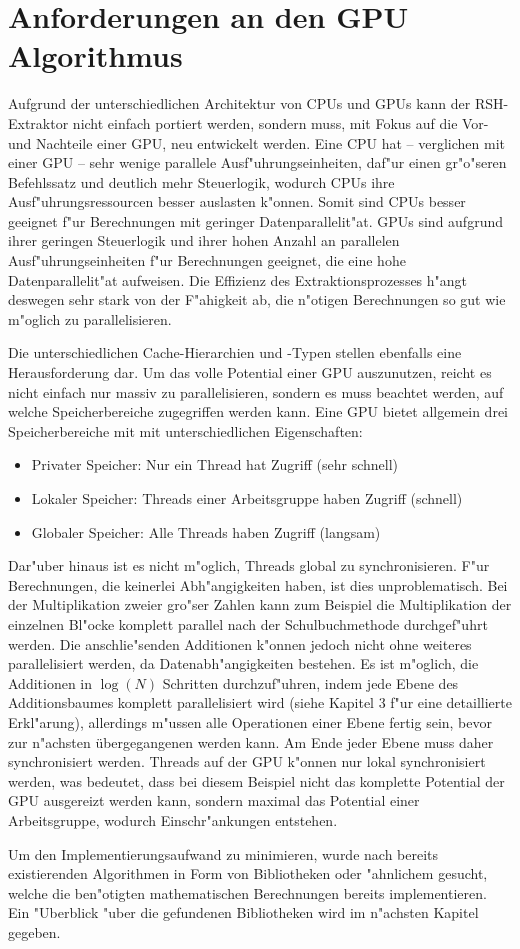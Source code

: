 \section{Anforderungen an den GPU Algorithmus}

Aufgrund der unterschiedlichen Architektur von CPUs und GPUs kann der RSH-Extraktor nicht einfach portiert werden, sondern muss, mit Fokus auf die Vor- und Nachteile einer GPU, neu entwickelt werden. Eine CPU hat -- verglichen mit einer GPU -- sehr wenige parallele Ausf"uhrungseinheiten, daf"ur einen gr"o"seren Befehlssatz und deutlich mehr Steuerlogik, wodurch CPUs ihre Ausf"uhrungsressourcen besser auslasten k"onnen. Somit sind CPUs besser geeignet f"ur Berechnungen mit geringer Datenparallelit"at. GPUs sind aufgrund ihrer geringen Steuerlogik und ihrer hohen Anzahl an parallelen Ausf"uhrungseinheiten f"ur Berechnungen geeignet, die eine hohe Datenparallelit"at aufweisen. Die Effizienz des Extraktionsprozesses h"angt deswegen sehr stark von der F"ahigkeit ab, die n"otigen Berechnungen so gut wie m"oglich zu parallelisieren. 

Die unterschiedlichen Cache-Hierarchien und -Typen stellen ebenfalls eine Herausforderung dar. Um das volle Potential einer GPU auszunutzen, reicht es nicht einfach nur massiv zu parallelisieren, sondern es muss beachtet werden, auf welche Speicherbereiche zugegriffen werden kann. Eine GPU bietet allgemein drei Speicherbereiche mit mit unterschiedlichen Eigenschaften:
\begin{itemize}
	\item Privater Speicher: Nur ein Thread hat Zugriff (sehr schnell)
	\item Lokaler Speicher: Threads einer Arbeitsgruppe haben Zugriff (schnell)
	\item Globaler Speicher: Alle Threads haben Zugriff (langsam)
\end{itemize}
Dar"uber hinaus ist es nicht m"oglich, Threads global zu synchronisieren. F"ur Berechnungen, die keinerlei Abh"angigkeiten haben, ist dies unproblematisch. Bei der Multiplikation zweier gro"ser Zahlen kann zum Beispiel die Multiplikation der einzelnen Bl"ocke komplett parallel nach der Schulbuchmethode durchgef"uhrt werden. Die anschlie"senden Additionen k"onnen jedoch nicht ohne weiteres parallelisiert werden, da Datenabh"angigkeiten bestehen. Es ist m"oglich, die Additionen in $\log(N)$ Schritten durchzuf"uhren, indem jede Ebene des Additionsbaumes komplett parallelisiert wird (siehe \cite{haque2012plain} Kapitel 3 f"ur eine detaillierte Erkl"arung), allerdings m"ussen alle Operationen einer Ebene fertig sein, bevor zur n"achsten übergegangenen werden kann. Am Ende jeder Ebene muss daher synchronisiert werden. Threads auf der GPU k"onnen nur lokal synchronisiert werden, was bedeutet, dass bei diesem Beispiel nicht das komplette Potential der GPU ausgereizt werden kann, sondern maximal das Potential einer Arbeitsgruppe, wodurch Einschr"ankungen entstehen.

Um den Implementierungsaufwand zu minimieren, wurde nach bereits existierenden Algorithmen in Form von Bibliotheken oder "ahnlichem gesucht, welche die ben"otigten mathematischen Berechnungen bereits implementieren. Ein "Uberblick "uber die gefundenen Bibliotheken wird im n"achsten Kapitel gegeben.